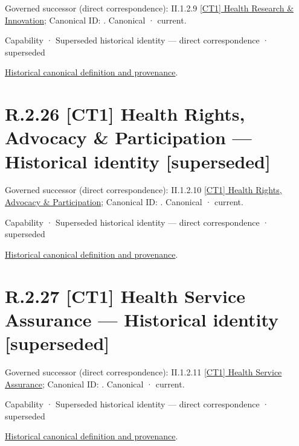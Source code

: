 {\small Governed successor (direct correspondence): II.1.2.9 \hyperref[element:582bf62145fd42118e5d57bb714841e8]{[CT1] Health Research \& Innovation}; Canonical ID: \texttt{}. Canonical · current.}\par
\label{element:2cc31384c8864c73989025cbe96dcfa7}
{\small Capability · Superseded historical identity — direct correspondence · superseded}\par
\href{../../../../continuum/strategy/capability/2cc31384c8864c73989025cbe96dcfa7.md}{Historical canonical definition and provenance}.\par
\section*{R.2.26 [CT1] Health Rights, Advocacy \& Participation — Historical identity [superseded]}
\label{navigation:R.2.26}

{\small Governed successor (direct correspondence): II.1.2.10 \hyperref[element:7ab5c82a500b45f39267883a6e78c482]{[CT1] Health Rights, Advocacy \& Participation}; Canonical ID: \texttt{}. Canonical · current.}\par
\label{element:58376e5c53bf4af0a54f99f21ac52666}
{\small Capability · Superseded historical identity — direct correspondence · superseded}\par
\href{../../../../continuum/strategy/capability/58376e5c53bf4af0a54f99f21ac52666.md}{Historical canonical definition and provenance}.\par
\section*{R.2.27 [CT1] Health Service Assurance — Historical identity [superseded]}
\label{navigation:R.2.27}

{\small Governed successor (direct correspondence): II.1.2.11 \hyperref[element:14860102964c441681d41ec3da423fe0]{[CT1] Health Service Assurance}; Canonical ID: \texttt{}. Canonical · current.}\par
\label{element:6a82dc1423374e809dbf542eeaa69482}
{\small Capability · Superseded historical identity — direct correspondence · superseded}\par
\href{../../../../continuum/strategy/capability/6a82dc1423374e809dbf542eeaa69482.md}{Historical canonical definition and provenance}.\par
